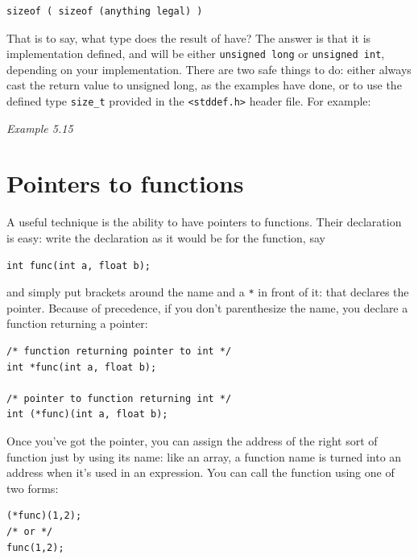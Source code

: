    \begin{Verbatim}
sizeof ( sizeof (anything legal) )
\end{Verbatim}

   That is to say, what type does the result of \sizeof{} have?
    The answer is that it is implementation defined, and will be either
    \texttt{unsigned long} or \texttt{unsigned int}, depending on
    your implementation. There are two safe things to do: either always cast
    the return value to unsigned long, as the examples have done, or to use
    the defined type \texttt{size\_t} provided in the
    \texttt{<stddef.h>} header file. For example:


   \begin{center}\textit{Example 5.15}\end{center}


  

 
        \section{Pointers to functions}
        

  

  A useful technique is the ability to have pointers to functions. Their
   declaration is easy: write the declaration as it would be for the
   function, say


  \begin{Verbatim}
int func(int a, float b);
\end{Verbatim}

  and simply put brackets around the name and a \texttt{*} in front
   of it: that declares the pointer. Because of precedence, if you don't
   parenthesize the name, you declare a function returning a pointer:


  \begin{Verbatim}
/* function returning pointer to int */
int *func(int a, float b);

/* pointer to function returning int */
int (*func)(int a, float b);
\end{Verbatim}

  Once you've got the pointer, you can assign the address of the right
   sort of function just by using its name: like an array, a function name
   is turned into an address when it's used in an expression. You can call
   the function using one of two forms:


  \begin{Verbatim}
(*func)(1,2);
/* or */
func(1,2);
\end{Verbatim}

